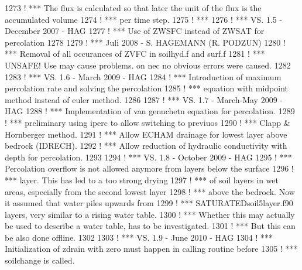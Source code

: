 \begin{DoxyCode}
1273 \textcolor{comment}{!     *** The flux is calculated so that later the unit of the flux is the accumulated volume}
1274 \textcolor{comment}{!     *** per time step.}
1275 \textcolor{comment}{!     ***}
1276 \textcolor{comment}{!     *** VS. 1.5 - December 2007 - HAG}
1277 \textcolor{comment}{!     ***           Use of ZWSFC instead of ZWSAT for percolation}
1278 
1279 \textcolor{comment}{!     ***           Juli 2008 - S. HAGEMANN (R. PODZUN)}
1280 \textcolor{comment}{!     ***           Removal of all occurances of ZVFC in soilhyd.f and surf.f}
1281 \textcolor{comment}{!     ***           UNSAFE! Use may cause problems. on nec no obvious errors were caused.}
1282 
1283 \textcolor{comment}{!     *** VS. 1.6 - March 2009 - HAG}
1284 \textcolor{comment}{!     ***           Introduction of maximum percolation rate and solving the percolation}
1285 \textcolor{comment}{!     ***           equation with midpoint method instead of euler method.}
1286 
1287 \textcolor{comment}{!     *** VS. 1.7 - March-May 2009 - HAG}
1288 \textcolor{comment}{!     ***           Implementation of van genuchetn equation for percolation.}
1289 \textcolor{comment}{!     ***           preliminary using iperc to allow switching to previuos}
1290 \textcolor{comment}{!     ***               Clapp & Hornberger method.}
1291 \textcolor{comment}{!     ***           Allow ECHAM drainage for lowest layer above bedrock (IDRECH).}
1292 \textcolor{comment}{!     ***           Allow reduction of hydraulic conductivity with depth for percolation.}
1293 
1294 \textcolor{comment}{!     *** VS. 1.8 - October 2009 - HAG}
1295 \textcolor{comment}{!     ***           Percolation overflow is not allowed anymore from layers below the surface}
1296 \textcolor{comment}{!     ***               layer. This has led to a too strong drying}
1297 \textcolor{comment}{!     ***               of soil layers in wet areas, especially from the second lowest layer}
1298 \textcolor{comment}{!     ***               above the bedrock. Now it assumed that water piles upwards from}
1299 \textcolor{comment}{!     ***               SATURATEDsoil5layer.f90 layers, very similar to a rising water table.}
1300 \textcolor{comment}{!     ***               Whether this may actually be used to describe a water table, has to be
       investigated.}
1301 \textcolor{comment}{!     ***               But this can be also done offline.}
1302 
1303 \textcolor{comment}{!     *** VS. 1.9 - June 2010 - HAG}
1304 \textcolor{comment}{!     ***            Initialization of zdrain with zero must happen in calling routine before}
1305 \textcolor{comment}{!     ***                soilchange is called.}

\end{DoxyCode}
